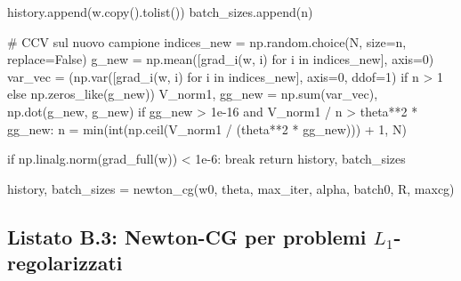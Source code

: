 \documentclass[a4paper,12pt]{article}
\numberwithin{equation}{section}
\numberwithin{figure}{section}
\numberwithin{table}{section}
\begin{document}
\begin{pythoncode}[title= Newton-CG]
        history.append(w.copy().tolist())
        batch_sizes.append(n)

        # CCV sul nuovo campione
        indices_new = np.random.choice(N, size=n, replace=False)
        g_new = np.mean([grad_i(w, i) for i in indices_new], axis=0)
        var_vec = (np.var([grad_i(w, i) for i in indices_new], axis=0, ddof=1)
                   if n > 1 else np.zeros_like(g_new))
        V_norm1, gg_new = np.sum(var_vec), np.dot(g_new, g_new)
        if gg_new > 1e-16 and V_norm1 / n > theta**2 * gg_new:
            n = min(int(np.ceil(V_norm1 / (theta**2 * gg_new))) + 1, N)

        if np.linalg.norm(grad_full(w)) < 1e-6:
            break
    return history, batch_sizes

history, batch_sizes = newton_cg(w0, theta, max_iter, alpha, batch0, R, maxcg)
\end{pythoncode}



\subsection{Listato B.3: Newton-CG per problemi $L_1$-regolarizzati}
\end{document}
